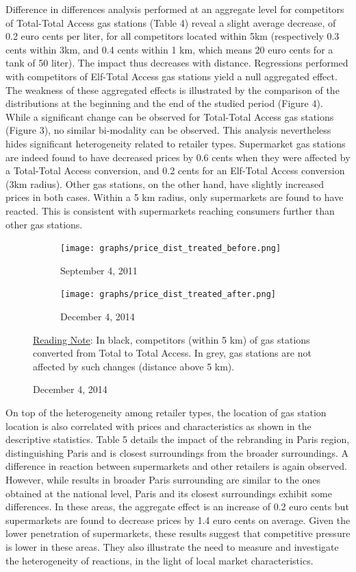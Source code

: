 \documentclass[english]{article}
\begin{document}
Difference in differences analysis performed at an aggregate level for competitors of Total-Total Access gas stations (Table 4) reveal a slight average decrease, of 0.2 euro cents per liter, for all competitors located within 5km (respectively 0.3 cents within 3km, and 0.4 cents within 1 km, which means 20 euro cents for a tank of 50 liter). The impact thus decreases with distance. Regressions performed with competitors of Elf-Total Access gas stations yield a null aggregated effect. The weakness of these aggregated effects is illustrated by the comparison of the distributions at the beginning and the end of the studied period (Figure 4). While a significant change can be observed for Total-Total Access gas stations (Figure 3), no similar bi-modality can be observed. This analysis nevertheless hides significant heterogeneity related to retailer types. Supermarket gas stations are indeed found to have decreased prices by 0.6 cents when they were affected by a Total-Total Access conversion, and 0.2 cents for an Elf-Total Access conversion (3km radius). Other gas stations, on the other hand, have slightly increased prices in both cases. Within a 5 km radius, only supermarkets are found to have reacted. This is consistent with supermarkets reaching consumers further than other gas stations.

\begin{figure}[htb!]
\centering
\caption{Distributions of Total Access competitor prices vs .others}
\label{fig:price_dist_total_comp_ba}
\begin{subfigure}{.49\textwidth}
\centering
\texttt{[image: graphs/price\_dist\_treated\_before.png]}
\caption[short]{September 4, 2011}
\end{subfigure}
\begin{subfigure}{.49\textwidth}
\centering
\texttt{[image: graphs/price\_dist\_treated\_after.png]}
\caption[short]{December 4, 2014}
\end{subfigure}
\flushleft
{\footnotesize{}\uline{Reading Note}}{\footnotesize{}: In black, competitors (within 5 km) of gas stations converted from Total to Total Access. In grey, gas stations are not affected by such changes (distance above 5 km).}{\footnotesize \par}
\end{figure}

On top of the heterogeneity among retailer types, the location of gas station location is also correlated with prices and characteristics as shown in the descriptive statistics. Table 5 details the impact of the rebranding in Paris region, distinguishing Paris and is closest surroundings from the broader surroundings. A difference in reaction between supermarkets and other retailers is again observed. However, while results in broader Paris surrounding are similar to the ones obtained at the national level, Paris and its closest surroundings exhibit some differences. In these areas, the aggregate effect is an increase of 0.2 euro cents but supermarkets are found to decrease prices by 1.4 euro cents on average. Given the lower penetration of supermarkets, these results suggest that competitive pressure is lower in these areas. They also illustrate the need to measure and investigate the heterogeneity of reactions, in the light of local market characteristics.
\end{document}
